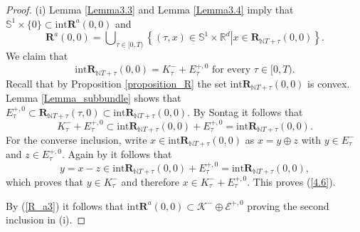 \documentclass{siamltex}%
\begin{document}
\begin{proof}
(i) Lemma \ref{Lemma3.3} and Lemma \ref{Lemma3.4} imply that $\mathbb{S}%
^{1}\times\{0\}\subset\mathrm{int}\mathbf{R}^{a}(0,0)$ and%
\begin{equation}
\mathbf{R}^{a}(0,0)=\bigcup\nolimits_{\tau\in\lbrack0,T)}\left\{  (\tau
,x)\in\mathbb{S}^{1}\times\mathbb{R}^{d}\left\vert x\in\mathbf{R}%
_{\mathbb{N}T+\tau}(0,0)\right.  \right\}  . \label{R_a3}%
\end{equation}
We claim that%
\begin{equation}
\mathrm{int}\mathbf{R}_{\mathbb{N}T+\tau}(0,0)=K_{\tau}^{-}+E_{\tau}%
^{+,0}\text{ for every }\tau\in\lbrack0,T). \label{4.6}%
\end{equation}
Recall that by Proposition \ref{proposition_R} the set $\mathrm{int}%
\mathbf{R}_{\mathbb{N}T+\tau}(0,0)$ is convex. Lemma \ref{Lemma_subbundle}
shows that $E_{\tau}^{+,0}\subset\mathbf{R}_{\mathbb{N}T+\tau}(\tau
,0)\subset\mathrm{int}\mathbf{R}_{\mathbb{N}T+\tau}(0,0)$. By Sontag
\cite[Lemma 3.6.4]{Son98} it follows that%
\[
K_{\tau}^{-}+E_{\tau}^{+,0}\subset\mathrm{int}\mathbf{R}_{\mathbb{N}T+\tau
}(0,0)+E_{\tau}^{+,0}=\mathrm{int}\mathbf{R}_{\mathbb{N}T+\tau}(0,0).
\]
For the converse inclusion, write $x\in\mathrm{int}\mathbf{R}_{\mathbb{N}%
T+\tau}(0,0)$ as $x=y\oplus z$ with $y\in E_{\tau}^{-}$ and $z\in E_{\tau
}^{+,0}$. Again by \cite[Lemma 3.6.4]{Son98} it follows that%
\[
y=x-z\in\mathrm{int}\mathbf{R}_{\mathbb{N}T+\tau}(0,0)+E_{\tau}^{+,0}%
=\mathrm{int}\mathbf{R}_{\mathbb{N}T+\tau}(0,0),
\]
which proves that $y\in K_{\tau}^{-}$ and therefore $x\in K_{\tau}^{-}%
+E_{\tau}^{+,0}$. This proves (\ref{4.6}).

By (\ref{R_a3}) it follows that $\mathrm{int}\mathbf{R}^{a}(0,0)\subset
\mathcal{K}^{-}\oplus\mathcal{E}^{+,0}$ proving the second inclusion in (i).


\end{proof}
\end{document}
